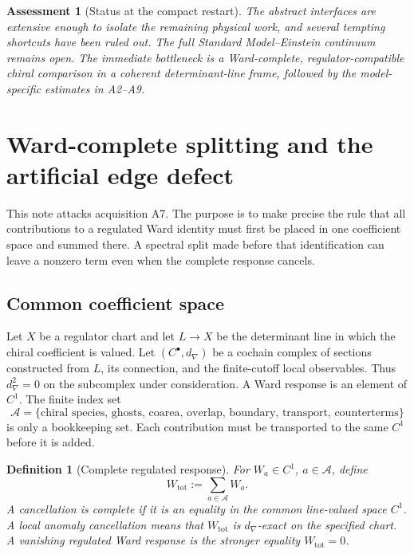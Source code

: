 \documentclass[11pt]{article}
\newtheorem{definition}[theorem]{Definition}
\newtheorem{assessment}[theorem]{Assessment}
\begin{document}
\begin{assessment}[Status at the compact restart]
\label{ass:v11v1-status}
The abstract interfaces are extensive enough to isolate the remaining
physical work, and several tempting shortcuts have been ruled out.  The
full Standard Model--Einstein continuum remains open.  The immediate
bottleneck is a Ward-complete, regulator-compatible chiral comparison in a
coherent determinant-line frame, followed by the model-specific estimates
in A2--A9.
\end{assessment}



\section{Ward-complete splitting and the artificial edge defect}
\label{sec:v11v2}

This note attacks acquisition A7.  The purpose is to make precise the rule
that all contributions to a regulated Ward identity must first be placed
in one coefficient space and summed there.  A spectral split made before
that identification can leave a nonzero term even when the complete
response cancels.

\subsection{Common coefficient space}

Let \(X\) be a regulator chart and let \(L\to X\) be the determinant line
in which the chiral coefficient is valued.  Let
\((C^\bullet,d_\nabla)\) be a cochain complex of sections constructed from
\(L\), its connection, and the finite-cutoff local observables.  Thus
\(d_\nabla^2=0\) on the subcomplex under consideration.  A Ward response is
an element of \(C^1\).  The finite index set
\[
 \mathscr A=
 \{\text{chiral species, ghosts, coarea, overlap, boundary,
 transport, counterterms}\}
\]
is only a bookkeeping set.  Each contribution must be transported to the
same \(C^1\) before it is added.

\begin{definition}[Complete regulated response]
\label{def:v11v2-complete}
For \(W_a\in C^1\), \(a\in\mathscr A\), define
\[
 W_{\mathrm{tot}}:=\sum_{a\in\mathscr A}W_a.
\]
A cancellation is \emph{complete} if it is an equality in the common
line-valued space \(C^1\).  A local anomaly cancellation means that
\(W_{\mathrm{tot}}\) is \(d_\nabla\)-exact on the specified chart.  A
vanishing regulated Ward response is the stronger equality
\(W_{\mathrm{tot}}=0\).
\end{definition}
\end{document}
